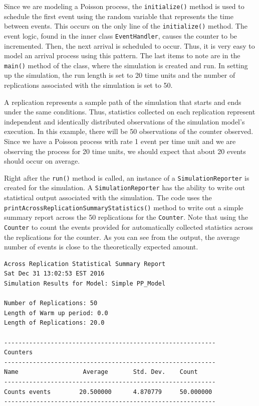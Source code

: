 \documentclass[
]{book}
\theoremstyle{definition}
\theoremstyle{definition}
\theoremstyle{definition}
\theoremstyle{definition}
\theoremstyle{remark}
\begin{document}
Since we are modeling a Poisson process, the \texttt{initialize()} method is used
to schedule the first event using the random variable that represents
the time between events. This occurs on the only line of the \texttt{initialize()} method. The event logic, found in the inner class \texttt{EventHandler},
causes the counter to be incremented. Then, the next arrival is scheduled
to occur. Thus, it is very easy to model an arrival process using this
pattern. The last items to note are in the \texttt{main()} method of the class,
where the simulation is created and run. In setting up the simulation,
the run length is set to 20 time units and the number of
replications associated with the simulation is set to 50.

A replication represents a sample path of the simulation that starts and
ends under the same conditions. Thus, statistics collected on each
replication represent independent and identically distributed
observations of the simulation model's execution. In this example, there
will be 50 observations of the counter observed. Since we have a Poisson
process with rate 1 event per time unit and we are observing the process
for 20 time units, we should expect that about 20 events should occur on
average.

Right after the \texttt{run()} method is called, an instance of a \texttt{SimulationReporter} is created for the
simulation. A \texttt{SimulationReporter} has the ability to write out
statistical output associated with the simulation. The code uses the
\texttt{printAcrossReplicationSummaryStatistics()} method to write out a simple
summary report across the 50 replications for the \texttt{Counter}. Note that
using the \texttt{Counter} to count the events provided for automatically
collected statistics across the replications for the counter. As you can
see from the output, the average number of events is close to the
theoretically expected amount.

\begin{verbatim}
Across Replication Statistical Summary Report
Sat Dec 31 13:02:53 EST 2016
Simulation Results for Model: Simple PP_Model

Number of Replications: 50
Length of Warm up period: 0.0
Length of Replications: 20.0

-----------------------------------------------------------
Counters
-----------------------------------------------------------
Name                  Average       Std. Dev.    Count
-----------------------------------------------------------
Counts events        20.500000      4.870779     50.000000 
-----------------------------------------------------------
\end{verbatim}
\end{document}
